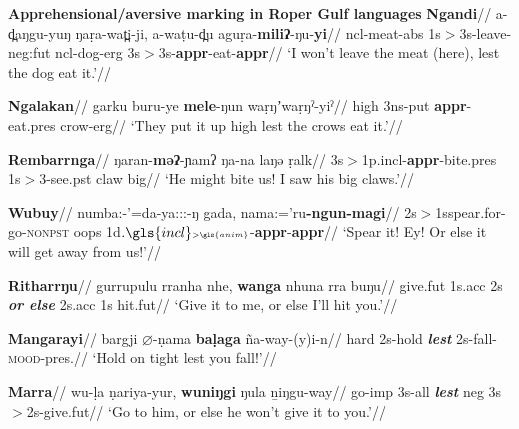 \documentclass[11pt]{article}
\begin{document}
\pex \textbf{Apprehensional/aversive marking in Roper Gulf languages}
\a\begingl\glpreamble \textbf{Ngandi}//
\gla a-d̪aŋgu-yuŋ ŋaṛa-wat̪i-ji, a-waṭu-d̪u aguṛa-\textbf{miliʔ}-ŋu-\textbf{yi}//
\glb \gls{ncl}-meat-\gls{abs} 1s$\scriptscriptstyle>$3s-leave-\gls{neg}:\gls{fut} \gls{ncl}-dog-\gls{erg} 3s$\scriptscriptstyle>$3s-\textbf{\gls{appr}}-eat-\textbf{\gls{appr}}//
\glft`I won't leave the meat (here), lest the dog eat it.'//
\endgl

\a \begingl\glpreamble \textbf{Ngalakan}//
\gla garku buru-ye \textbf{mele}-ŋun waṛŋʼwaṛŋˀ-yiˀ//
\glb high 3ns-put \textbf{\gls{appr}}-eat.\gls{pres} crow-\gls{erg}//
\glft`They put it up high lest the crows eat it.'//
\endgl

\a \begingl\glpreamble \textbf{Rembarrnga}//
\gla ŋaran-\textbf{mǝʔ}-ɲamʔ ŋa-na laŋǝ ṛalk//
\glb 3s$\scriptscriptstyle>$1p.\gls{incl}-\textbf{\gls{appr}}-bite.\gls{pres} 1s$\scriptscriptstyle>$3-see.\gls{pst} claw big//
\glft`He might bite us! I saw his big claws.'//
\endgl


\a\begingl\glpreamble\textbf{Wubuy}//
\gla numba:-'=da-ya:::-ŋ gada, nama:='ru\textbf{-ngun-magi}//
\glb 2s$\scriptscriptstyle>$1s\textdblhyphen{}spear.for-go-\textsc{nonpst} oops 1d$.\gls{incl}\scriptscriptstyle>\gls{anim}$-\textbf{\gls{appr}}-\textbf{\gls{appr}}//
\glft`Spear it! Ey! Or else it will get away from us!'//
\endgl


\a\begingl\glpreamble\textbf{Ritharrŋu}//
\gla gurrupulu rranha nhe, \textbf{wanga} nhuna rra buŋu//
\glb give.\gls{fut} 1s.\gls{acc} 2s \textbf{\textit{or else}} 2s.\gls{acc} 1s hit.\gls{fut}//
\glft`Give it to me, or else I'll hit you.'//\endgl


\a\begingl\glpreamble \textbf{Mangarayi}//
\gla bargji $\varnothing$-ṇama \textbf{baḷaga} ña-way-(y)i-n//
\glb hard 2s-hold \textsl{\textbf{lest}} 2s-fall-\textsc{mood}-\gls{pres}.//
\glft`Hold on tight lest you  fall!'//
\endgl



\a\begingl\glpreamble \textbf{Marra}//
\gla wu-ḷa ṇariya-yur, \textbf{wuniŋgi} ŋula ṉiŋgu-way//
\glb go-\gls{imp} 3s-\gls{all} \textit{\textbf{lest}} \gls{neg} 3s$\scriptscriptstyle>$2s-give.\gls{fut}//
\glft`Go to him, or else he won't give it to you.'//\endgl
\end{document}
